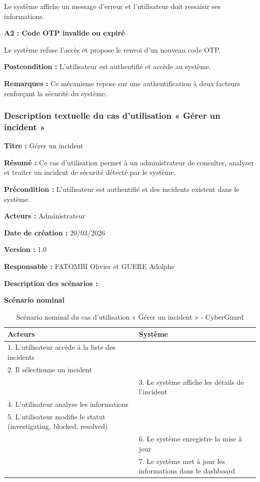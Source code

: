 \documentclass[a4paper,12pt]{report}
\begin{document}
    Le système affiche un message d’erreur et l’utilisateur doit ressaisir ses informations.
    
    \textbf{A2 : Code OTP invalide ou expiré}
     
    Le système refuse l’accès et propose le renvoi d’un nouveau code OTP.
    
    \textbf{Postcondition :}  
    L’utilisateur est authentifié et accède au système.
    
    \textbf{Remarques :}  
    Ce mécanisme repose sur une authentification à deux facteurs renforçant la sécurité du système.
    
    \subsubsection{Description textuelle du cas d’utilisation « Gérer un incident »}
    
    \textbf{Titre :} Gérer un incident  
    
    \textbf{Résumé :}  
    Ce cas d’utilisation permet à un administrateur de consulter, analyser et traiter un incident de sécurité détecté par le système.
    
    \textbf{Précondition :}  
    L’utilisateur est authentifié et des incidents existent dans le système.
    
    \textbf{Acteurs :}  
    Administrateur
    
    \textbf{Date de création :} 20/03/2026 
     
    \textbf{Version :} 1.0  
    
    \textbf{Responsable :} FATOMBI Olivier et GUERE Adolphe
    
    \textbf{Description des scénarios :}
    
    \textbf{Scénario nominal}
    
    \begin{table}[H]
        \centering
        \begin{tabular}{|p{6cm}|p{6cm}|}
            \hline
            \textbf{Acteurs} & \textbf{Système} \\
            \hline
            1. L’utilisateur accède à la liste des incidents & \\
            2. Il sélectionne un incident & \\
            \hline
            & 3. Le système affiche les détails de l’incident \\
            \hline
            4. L’utilisateur analyse les informations & \\
            5. L’utilisateur modifie le statut (investigating, blocked, resolved) & \\
            \hline
            & 6. Le système enregistre la mise à jour \\
            & 7. Le système met à jour les informations dans le dashboard \\
            \hline
        \end{tabular}
        \caption{Scénario nominal du cas d’utilisation « Gérer un incident » - CyberGuard}
    \end{table}
    
\end{document}

